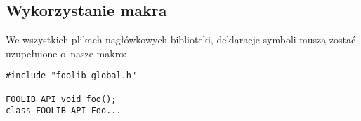 \subsection{Wykorzystanie makra}
We wszystkich plikach nagłówkowych biblioteki, deklaracje symboli muszą zostać uzupełnione o~nasze makro:

\begin{lstlisting}[caption=Eksport symboli, label=code:eksport:sym]
#include "foolib_global.h"

FOOLIB_API void foo();
class FOOLIB_API Foo...
\end{lstlisting}

